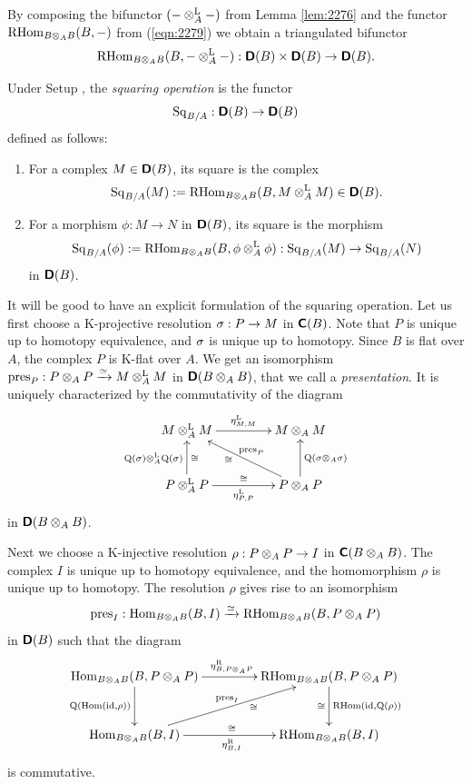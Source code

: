 By composing the bifunctor $(- \otimes^{\mathrm{L}}_A -)$ from Lemma \ref{lem:2276} 
and the functor \lb 
$\operatorname{RHom}_{B \otimes_{A} B}(B, -)$ from (\ref{eqn:2279})
we obtain a triangulated bifunctor 
\begin{equation} \label{eqn:2280}
\operatorname{RHom}_{B \otimes_{A} B}(B, - \otimes^{\mathrm{L}}_{A} -) :
\boldsymbol{\mathsf{D}}(B) \times \boldsymbol{\mathsf{D}}(B) \to \boldsymbol{\mathsf{D}}(B) .
\end{equation}

\begin{dfn} \label{dfn:2275} 
Under Setup \tup{\ref{set:2285}}, the {\em squaring operation} 
is the functor 
\[ \operatorname{Sq}_{B / A} : \boldsymbol{\mathsf{D}}(B) \to \boldsymbol{\mathsf{D}}(B) \]
defined as follows:
\begin{enumerate}
\item For a complex $M \in \boldsymbol{\mathsf{D}}(B)$, its square is the complex 
\[ \operatorname{Sq}_{B / A}(M) := 
\operatorname{RHom}_{B \otimes_{A} B}(B, M \otimes^{\mathrm{L}}_{A} M) \in \boldsymbol{\mathsf{D}}(B) . \]

\item For a morphism 
$\phi : M \to N$ in $\boldsymbol{\mathsf{D}}(B)$, its square is the morphism 
\[ \operatorname{Sq}_{B / A}(\phi) := 
\operatorname{RHom}_{B \otimes_{A} B}(B, \phi \otimes^{\mathrm{L}}_{A} \phi) :
\operatorname{Sq}_{B / A}(M) \to \operatorname{Sq}_{B / A}(N) \]
in $\boldsymbol{\mathsf{D}}(B)$.
\end{enumerate}
\end{dfn}

It will be good to have an explicit formulation of the squaring operation. 
Let us first choose a K-projective resolution 
$\sigma : P \to M$ in $\boldsymbol{\mathsf{C}}(B)$. 
Note that $P$ is unique up to homotopy equivalence, and $\sigma$ is unique up to 
homotopy. Since $B$ is flat over $A$, the complex $P$ is K-flat over $A$. We 
get an isomorphism 
$\operatorname{pres}_{P} : P \otimes_A P \xrightarrow{\simeq} M \otimes^{\mathrm{L}}_{A} M$ 
in $\boldsymbol{\mathsf{D}}(B \otimes_{A} B)$, that we call a {\em presentation}. It is uniquely 
characterized by the commutativity of the diagram
\[ \UseTips \xymatrix @C=10ex @R=6ex {
M \ot^{\mrm{L}}_{A} M
\ar[r]^{\eta^{\mrm{L}}_{M, M}}
&
M \ot_A M
\\
P \ot^{\mrm{L}}_{A} P
\ar[r]_{\eta^{\mrm{L}}_{P, P}}^{\cong}
\ar[u]^{\opn{Q}(\si) \ot^{\mrm{L}}_A \opn{Q}(\si)}_{\cong}
&
P \ot_A P
\ar[ul]_{\opn{pres}_{P}}^(0.6){\cong}
\ar[u]_{\opn{Q}(\si \ot_A \si)}
} \]
in $\boldsymbol{\mathsf{D}}(B \otimes_{A} B)$. 

Next we choose a K-injective resolution 
$\rho : P \otimes_A P \to I$ in $\boldsymbol{\mathsf{C}}(B \otimes_{A} B)$. 
The complex $I$ is unique up to homotopy equivalence,
and the homomorphism $\rho$ is unique up to homotopy. The resolution 
$\rho$ gives rise to an isomorphism
\[ \operatorname{pres}_{I} : \operatorname{Hom}_{B \otimes_{A} B}(B, I) \xrightarrow{\simeq} 
\operatorname{RHom}_{B \otimes_{A} B}(B, P \otimes_{A} P) \]
in $\boldsymbol{\mathsf{D}}(B)$ such that the diagram 
\[ \UseTips \xymatrix @C=10ex @R=7ex {
\opn{Hom}_{B \ot_{A} B}(B, P \ot_{A} P)
\ar[r]^{\eta^{\mrm{R}}_{B, P \ot_{A} P}}
\ar[d]_{\opn{Q}(\opn{Hom}(\opn{id}, \rho))}
&
\opn{RHom}_{B \ot_{A} B}(B, P \ot_{A} P)
\ar[d]^{\opn{RHom}(\opn{id}, \opn{Q}(\rho))}_{\cong}
\\
\opn{Hom}_{B \ot_{A} B}(B, I)
\ar[r]_{\eta^{\mrm{R}}_{B, I}}^{\cong}
\ar[ur]^{\opn{pres}_{I}}_(0.6){\cong}
&
\opn{RHom}_{B \ot_{A} B}(B, I)
} \]
is commutative. 

